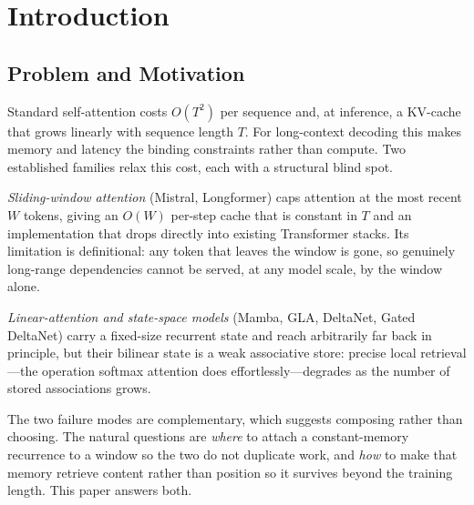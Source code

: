\documentclass[letterpaper]{article} %
\begin{document}

\section{Introduction}

\subsection{Problem and Motivation}
Standard self-attention costs $O(T^2)$ per sequence and, at inference, a KV-cache that grows linearly with sequence length $T$. For long-context decoding this makes memory and latency the binding constraints rather than compute. Two established families relax this cost, each with a structural blind spot.

\emph{Sliding-window attention} (Mistral, Longformer) caps attention at the most recent $W$ tokens, giving an $O(W)$ per-step cache that is constant in $T$ and an implementation that drops directly into existing Transformer stacks. Its limitation is definitional: any token that leaves the window is gone, so genuinely long-range dependencies cannot be served, at any model scale, by the window alone.

\emph{Linear-attention and state-space models} (Mamba, GLA, DeltaNet, Gated DeltaNet) carry a fixed-size recurrent state and reach arbitrarily far back in principle, but their bilinear state is a weak associative store: precise local retrieval---the operation softmax attention does effortlessly---degrades as the number of stored associations grows.

The two failure modes are complementary, which suggests composing rather than choosing. The natural questions are \emph{where} to attach a constant-memory recurrence to a window so the two do not duplicate work, and \emph{how} to make that memory retrieve content rather than position so it survives beyond the training length. This paper answers both.
\end{document}
